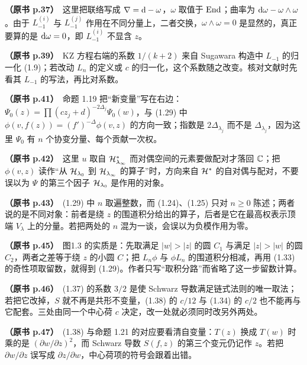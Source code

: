 \noindent \textbf{（原书 p.37）}\ 这里把联络写成 $\nabla=\mathrm{d}-\omega$，$\omega$ 取值于 $\operatorname{End}$；曲率为 $\mathrm{d}\omega-\omega\wedge\omega$。由于 $L_{-1}^{(i)}$ 与 $L_{-1}^{(j)}$ 作用在不同分量上，二者交换，$\omega\wedge\omega=0$ 是显然的，真正要算的是 $\mathrm{d}\omega=0$，即 $L_{-1}^{(i)}$ 不显含 $z$。\par\smallskip

\noindent \textbf{（原书 p.39）}\ KZ 方程右端的系数 $1/(k+2)$ 来自 Sugawara 构造中 $L_{-1}$ 的归一化 (1.9)；若改动 $L_n$ 的定义或 $c$ 的归一化，这个系数随之改变。核对文献时先看其 $L_{-1}$ 的写法，再比对系数。\par\smallskip

\noindent \textbf{（原书 p.41）}\ 命题 1.19 把“新变量”写在右边：$\Psi_0(z)=\prod(cz_j+d)^{-2\Delta_j}\Psi_0(w)$，与 (1.29) 中 $\phi(v,f(z))=(f')^{-\Delta}\phi(v,z)$ 的方向一致；指数是 $2\Delta_{\lambda_j}$ 而不是 $\Delta_{\lambda_j}$，因为这里 $\Psi_0$ 有 $n$ 个协变分量、每个贡献一次权。\par\smallskip

\noindent \textbf{（原书 p.42）}\ 这里 $u$ 取自 $\mathcal{H}_{\lambda_\infty}^{*}$ 而对偶空间的元素要做配对才落回 $\mathbb{C}$；把 $\phi(v,z)$ 读作“从 $\mathcal{H}_{\lambda_0}$ 到 $\mathcal{H}_{\lambda_\infty}$ 的算子”时，方向来自 $\mathcal{H}^{*}$ 的自对偶与配对，不要误以为 $\Psi$ 的第三个因子 $\mathcal{H}_{\lambda_0}$ 是作用的对象。\par\smallskip

\noindent \textbf{（原书 p.43）}\ (1.29) 中 $n$ 取遍整数，而 (1.24)、(1.25) 只对 $n\ge 0$ 陈述；两者说的是不同对象：前者是绕 $z$ 的围道积分给出的算子，后者是它在最高权表示顶端 $V_\lambda$ 上的分量。若把两处的 $n$ 混为一谈，会误以为负模作用为零。\par\smallskip

\noindent \textbf{（原书 p.45）}\ 图1.3 的实质是：先取满足 $|w|>|z|$ 的圆 $C_1$ 与满足 $|z|>|w|$ 的圆 $C_2$，两者之差等于绕 $z$ 的小圆 $C$；把 $L_n\phi$ 与 $\phi L_n$ 的围道积分相减，再用 (1.33) 的奇性项取留数，就得到 (1.29)。作者只写“取积分路”而省略了这一步留数计算。\par\smallskip

\noindent \textbf{（原书 p.46）}\ (1.37) 的系数 $3/2$ 是使 Schwarz 导数满足链式法则的唯一取法；若把它改掉，$S$ 就不再是共形不变量，(1.38) 的 $c/12$ 与 (1.34) 的 $c/2$ 也不能再与它配套。三处由同一个中心荷 $c$ 决定，改一处就必须同时改另外两处。\par\smallskip

\noindent \textbf{（原书 p.47）}\ (1.38) 与命题 1.21 的对应要看清自变量：$T(z)$ 换成 $T(w)$ 时乘的是 $(\partial w/\partial z)^{2}$，而 Schwarz 导数 $S(f,z)$ 的第三个变元仍记作 $z$。若把 $\partial w/\partial z$ 误写成 $\partial z/\partial w$，中心荷项的符号会跟着出错。\par\smallskip

